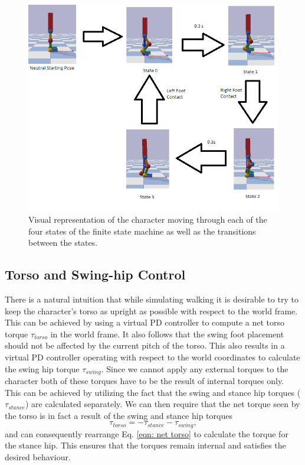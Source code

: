 \documentclass[12pt, a4paper]{article}
\begin{document}
  
\begin{figure}
\begin{center}
\includegraphics[scale=0.8]{finite_state}
\caption{Visual representation of the character moving through each of the four states of the finite state machine as well as the transitions between the states.}
\label{fig: finite state}
\end{center}
\end{figure}

\subsection{Torso and Swing-hip Control}
\label{subsec: torso swing hip control}
There is a natural intuition that while simulating walking it is desirable to try to keep the character's torso as upright as possible with respect to the world frame. This can be achieved by using a virtual PD controller to compute a net torso torque $\tau_{torso}$ in the world frame. It also follows that the swing  foot placement should not be affected by the current pitch of the torso. This also results in a virtual PD controller operating with respect to the world coordinates to calculate the swing hip torque $\tau_{swing}$. Since we cannot apply any external torques to the character both of these torques have to be the result of internal torques only. This can be achieved by utilizing the fact that the swing and stance hip torques ($\tau_{stance}$) are calculated separately. We can then require that the net torque seen by the torso is in fact a result of the swing and stance hip torques
\begin{equation}
\tau_{torso} = -\tau_{stance} - \tau_{swing},
\label{eqn: net torso}
\end{equation}
\noindent
and can consequently rearrange Eq. \ref{eqn: net torso} to calculate the torque for the stance hip. This ensures that the torques remain internal and satisfies the desired behaviour.
\end{document}
